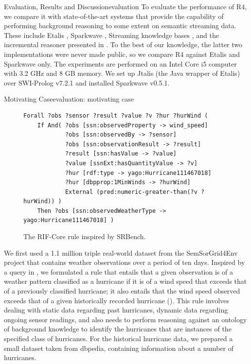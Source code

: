 \begin{nestedsection}{Evaluation, Results and Discussion}{evaluation}
	To evaluate the performance of R4, we compare it with state-of-the-art systems that provide the capability of performing background reasoning to some extent on semantic streaming data.
	These include Etalis \citep{EP-SPARQL}, Sparkwave \citep{sparkwave}, Streaming knowledge bases \citep{walavalkar08streamingkb}, and the incremental reasoner presented in \citep{inc-reasoning-background-knowledge}.
	To the best of our knowledge, the latter two implementations were never made public, so we compare R4 against Etalis and Sparkwave only.
	The experiments are performed on an Intel Core i5 computer with 3.2 GHz and 8 GB memory.
	We set up Jtalis (the Java wrapper of Etalis) over SWI-Prolog v7.2.1 and installed Sparkwave v0.5.1.

	\begin{nestedsection}{Motivating Case}{evaluation: motivating case}
		\begin{figure}[t]
			\centering
			\begin{verbatim}
Forall ?obs ?sensor ?result ?value ?v ?hur ?hurWind (
    If And( ?obs [ssn:observedProperty -> wind_speed]
    		?obs [ssn:observedBy -> ?sensor]
            ?obs [ssn:observationResult -> ?result] 
            ?result [ssn:hasValue -> ?value]
            ?value [ssnExt:hasQuantityValue -> ?v]
            ?hur [rdf:type -> yago:Hurricane111467018]
            ?hur [dbpprop:1MinWinds -> ?hurWind] 
            External (pred:numeric-greater-than(?v ?hurWind)) )
    Then ?obs [ssn:observedWeatherType -> yago:Hurricane111467018] )
			\end{verbatim}
			\caption{The RIF-Core rule inspired by SRBench.}
		\end{figure}

		We first used a 1.1 million triple real-world dataset from the SemSorGrid4Env project that contains weather observations over a period of ten days.
		Inspired by a query in \citep{SRBench}, we formulated a rule that entails that a given observation is of a weather pattern classified as a hurricane if it is of a wind speed that exceeds that of a previously classified hurricane;
		it also entails that the wind speed observed exceeds that of a given historically recorded hurricane ().
		This rule involves dealing with static data regarding past hurricanes, dynamic data regarding ongoing sensor readings, and also needs to perform reasoning against an ontology of background knowledge to identify the hurricanes that are instances of the specified class of hurricanes.
		For the historical hurricane data, we prepared a small dataset taken from dbpedia, containing information about a number of hurricanes.


\end{nestedsection}
\end{nestedsection}
